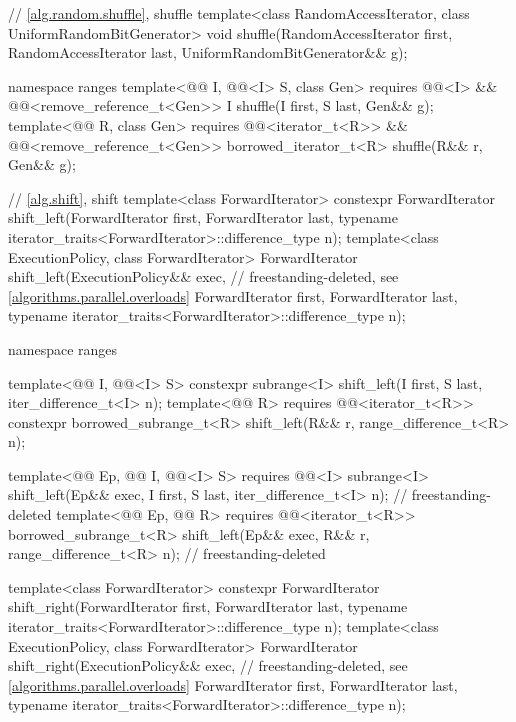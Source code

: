 \begin{codeblock}
{  // \ref{alg.random.shuffle}, shuffle
  template<class RandomAccessIterator, class UniformRandomBitGenerator>
    void shuffle(RandomAccessIterator first,
                 RandomAccessIterator last,
                 UniformRandomBitGenerator&& g);

  namespace ranges {
    template<@@ I, @@<I> S, class Gen>
      requires @@<I> &&
               @@<remove_reference_t<Gen>>
      I shuffle(I first, S last, Gen&& g);
    template<@@ R, class Gen>
      requires @@<iterator_t<R>> &&
               @@<remove_reference_t<Gen>>
      borrowed_iterator_t<R> shuffle(R&& r, Gen&& g);
  }

  // \ref{alg.shift}, shift
  template<class ForwardIterator>
    constexpr ForwardIterator
      shift_left(ForwardIterator first, ForwardIterator last,
                 typename iterator_traits<ForwardIterator>::difference_type n);
  template<class ExecutionPolicy, class ForwardIterator>
    ForwardIterator
      shift_left(ExecutionPolicy&& exec,                        // freestanding-deleted, see \ref{algorithms.parallel.overloads}
                 ForwardIterator first, ForwardIterator last,
                 typename iterator_traits<ForwardIterator>::difference_type n);

  namespace ranges {
    template<@@ I, @@<I> S>
      constexpr subrange<I> shift_left(I first, S last, iter_difference_t<I> n);
    template<@@ R>
      requires @@<iterator_t<R>>
      constexpr borrowed_subrange_t<R> shift_left(R&& r, range_difference_t<R> n);

    template<@@ Ep, @@ I, @@<I> S>
      requires @@<I>
      subrange<I>
        shift_left(Ep&& exec, I first, S last, iter_difference_t<I> n);     // freestanding-deleted
    template<@@ Ep, @@ R>
      requires @@<iterator_t<R>>
      borrowed_subrange_t<R>
        shift_left(Ep&& exec, R&& r, range_difference_t<R> n);              // freestanding-deleted
  }

  template<class ForwardIterator>
    constexpr ForwardIterator
      shift_right(ForwardIterator first, ForwardIterator last,
                  typename iterator_traits<ForwardIterator>::difference_type n);
  template<class ExecutionPolicy, class ForwardIterator>
    ForwardIterator
      shift_right(ExecutionPolicy&& exec,                       // freestanding-deleted, see \ref{algorithms.parallel.overloads}
                  ForwardIterator first, ForwardIterator last,
                  typename iterator_traits<ForwardIterator>::difference_type n);

}
\end{codeblock}
